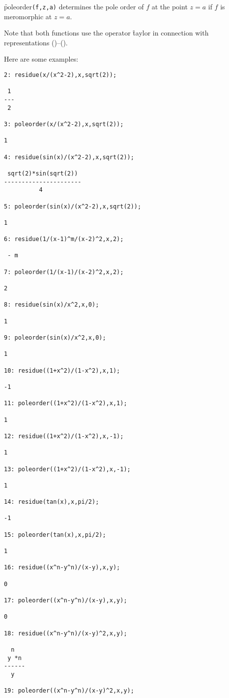 \f{poleorder}\texttt{(f,z,a)} determines the pole order of $f$ at the point $z=a$
if $f$ is meromorphic at $z=a$.

Note that both functions use the operator \f{taylor} in
connection with representations ()--().

Here are some examples:
\begin{small}
\begin{verbatim}
2: residue(x/(x^2-2),x,sqrt(2));

 1
---
 2

3: poleorder(x/(x^2-2),x,sqrt(2));

1

4: residue(sin(x)/(x^2-2),x,sqrt(2));

 sqrt(2)*sin(sqrt(2))
----------------------
          4

5: poleorder(sin(x)/(x^2-2),x,sqrt(2));

1

6: residue(1/(x-1)^m/(x-2)^2,x,2);

 - m

7: poleorder(1/(x-1)/(x-2)^2,x,2);

2

8: residue(sin(x)/x^2,x,0);

1

9: poleorder(sin(x)/x^2,x,0);

1

10: residue((1+x^2)/(1-x^2),x,1);

-1

11: poleorder((1+x^2)/(1-x^2),x,1);

1

12: residue((1+x^2)/(1-x^2),x,-1);

1

13: poleorder((1+x^2)/(1-x^2),x,-1);

1

14: residue(tan(x),x,pi/2);

-1

15: poleorder(tan(x),x,pi/2);

1

16: residue((x^n-y^n)/(x-y),x,y);

0

17: poleorder((x^n-y^n)/(x-y),x,y);

0

18: residue((x^n-y^n)/(x-y)^2,x,y);

  n
 y *n
------
  y

19: poleorder((x^n-y^n)/(x-y)^2,x,y);


\end{verbatim}
\end{small}
